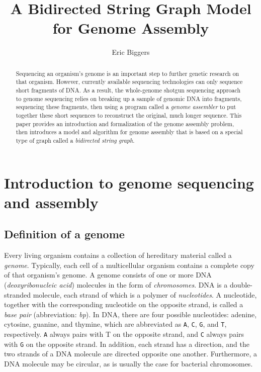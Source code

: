 \documentclass[12pt]{article}
\title{A Bidirected String Graph Model for Genome Assembly}
\author{Eric Biggers}
\newcommand\Base[1]{{\tt #1}}
\newcommand{\KeyTerm}[1]{{\it #1}}
\begin{document}
\maketitle

\begin{abstract}

Sequencing an organism's genome is an important step to further genetic research
on that organism.  However, currently available sequencing technologies can only
sequence short fragments of DNA.  As a result, the whole-genome shotgun
sequencing approach to genome sequencing relies on breaking up a sample of
genomic DNA into fragments, sequencing these fragments, then using a program
called a {\em genome assembler} to put together these short sequences to
reconstruct the original, much longer sequence.  This paper provides an
introduction and formalization of the genome assembly problem, then introduces a
model and algorithm for genome assembly that is based on a special type of graph
called a \KeyTerm{bidirected string graph}.  \end{abstract}

\tableofcontents

\section{Introduction to genome sequencing and assembly}

\subsection{Definition of a genome}

Every living organism contains a collection of hereditary material called a
\KeyTerm{genome}.  Typically, each cell of a multicellular organism contains a
complete copy of that organism's genome.  A genome consists of one or more DNA
(\KeyTerm{deoxyribonucleic acid}) molecules in the form of
\KeyTerm{chromosomes}.  DNA is a double-stranded molecule, each strand of which
is a polymer of \KeyTerm{nucleotides}.  A nucleotide, together with the
corresponding nucleotide on the opposite strand, is called a \KeyTerm{base pair}
(abbreviation: \KeyTerm{bp}).  In DNA, there are four possible nucleotides:
adenine, cytosine, guanine, and thymine, which are abbreviated as \Base{A},
\Base{C}, \Base{G}, and \Base{T}, respectively.  \Base{A} always pairs with T on
the opposite strand, and \Base{C} always pairs with \Base{G} on the opposite strand.
In addition, each strand has a direction, and the two strands of a DNA molecule
are directed opposite one another.  Furthermore, a DNA molecule may be circular,
as is usually the case for bacterial chromosomes.
\end{document}
